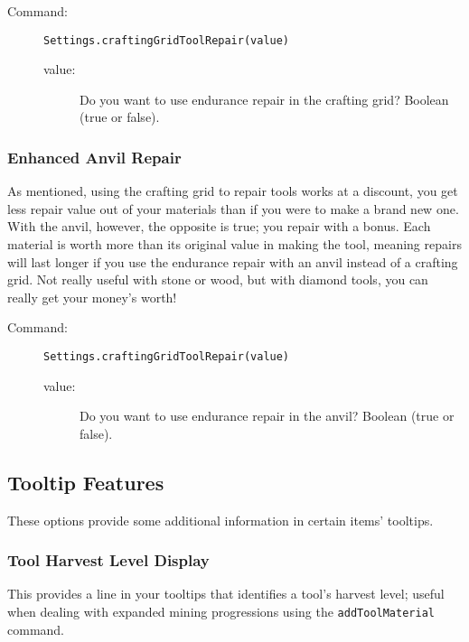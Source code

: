 \documentclass[letterpaper,titlepage,12pt]{article}
\begin{document}
\begin{description}
\item[Command:] \texttt{Settings.craftingGridToolRepair(value)}
\begin{description}
\item [value:] Do you want to use endurance repair in the crafting grid?  Boolean (true or false).
\end{description}
\end{description}

\subsubsection{Enhanced Anvil Repair}

As mentioned, using the crafting grid to repair tools works at a discount, you get less repair value out of your materials than if you were to make a brand new one.  With the anvil, however, the opposite is true; you repair with a bonus.  Each material is worth more than its original value in making the tool, meaning repairs will last longer if you use the endurance repair with an anvil instead of a crafting grid.  Not really useful with stone or wood, but with diamond tools, you can really get your money's worth!

\begin{description}
\item[Command:] \texttt{Settings.craftingGridToolRepair(value)}
\begin{description}
\item [value:] Do you want to use endurance repair in the anvil?  Boolean (true or false).
\end{description}
\end{description}

\subsection{Tooltip Features}

These options provide some additional information in certain items' tooltips.

\subsubsection{Tool Harvest Level Display}

This provides a line in your tooltips that identifies a tool's harvest level; useful when dealing with expanded mining progressions using the \texttt{addToolMaterial} command.
\end{document}
